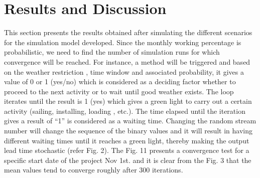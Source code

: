 \section{Results and Discussion}

This section presents the results obtained after simulating the different scenarios for the simulation model developed. Since the monthly working percentage is probabilistic, we need to find the number of simulation runs for which convergence will be reached. For instance, a method will be triggered and based on the weather restriction , time window and associated probability, it gives a value of 0 or 1 (yes/no) which is considered as a deciding factor whether to proceed to the next activity or to wait until good weather exists. The loop iterates until the result is 1 (yes) which gives a green light to carry out a certain activity (sailing, installing, loading , etc.). The time elapsed until the iteration gives a result of “1” is considered as a waiting time. Changing the random stream number will change the sequence of the binary values and it will result in having different waiting times until it reaches a green light, thereby making the output lead time stochastic (refer Fig. 2). The Fig. 11 presents a convergence test for a specific start date of the project Nov 1st. and it is clear from the Fig. 3 that the mean values tend to converge roughly after 300 iterations.